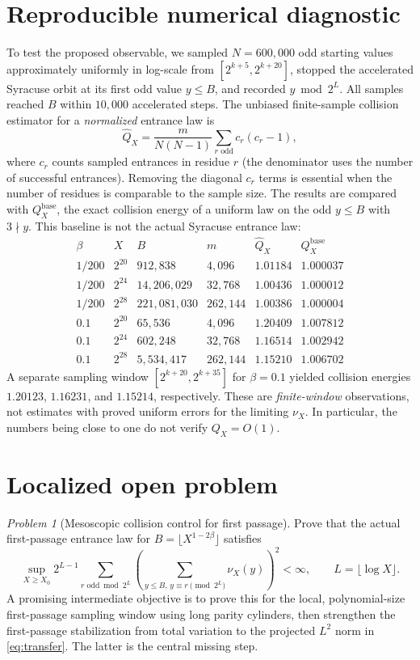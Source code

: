 \documentclass[11pt]{amsart}
\theoremstyle{remark}
\newtheorem{problem}{Problem}
\newcommand{\1}{\mathbf1}
\begin{document}
\section{Reproducible numerical diagnostic}
To test the proposed observable, we sampled $N=600{,}000$ odd starting values approximately uniformly in log-scale from $[2^{k+5},2^{k+20}]$, stopped the accelerated Syracuse orbit at its first odd value $y\le B$, and recorded $y\bmod2^L$. All samples reached $B$ within $10{,}000$ accelerated steps. The unbiased finite-sample collision estimator for a \emph{normalized} entrance law is
\[
 \widehat Q_X=\frac{m}{N(N-1)}\sum_{r\text{ odd}}c_r(c_r-1),
\]
where $c_r$ counts sampled entrances in residue $r$ (the denominator uses the number of successful entrances). Removing the diagonal $c_r$ terms is essential when the number of residues is comparable to the sample size. The results are compared with $Q_X^{\mathrm{base}}$, the exact collision energy of a uniform law on the odd $y\le B$ with $3\nmid y$.  This baseline is not the actual Syracuse entrance law:
\[
\begin{array}{c|r|r|r|r|r}
 \beta & X & B & m & \widehat Q_X & Q_X^{\mathrm{base}} \\\hline
 1/200&2^{20}&912{,}838&4{,}096&1.01184&1.000037\\
 1/200&2^{24}&14{,}206{,}029&32{,}768&1.00436&1.000012\\
 1/200&2^{28}&221{,}081{,}030&262{,}144&1.00386&1.000004\\
 0.1&2^{20}&65{,}536&4{,}096&1.20409&1.007812\\
 0.1&2^{24}&602{,}248&32{,}768&1.16514&1.002942\\
 0.1&2^{28}&5{,}534{,}417&262{,}144&1.15210&1.006702
\end{array}
\]
A separate sampling window $[2^{k+20},2^{k+35}]$ for $\beta=0.1$ yielded collision energies $1.20123$, $1.16231$, and $1.15214$, respectively. These are \emph{finite-window} observations, not estimates with proved uniform errors for the limiting $\nu_X$. In particular, the numbers being close to one do not verify $Q_X=O(1)$.

\section{Localized open problem}
\begin{problem}[Mesoscopic collision control for first passage]
Prove that the actual first-passage entrance law for $B=\lfloor X^{1-2\beta}\rfloor$ satisfies
\[
 \sup_{X\ge X_0}2^{L-1}\sum_{r\text{ odd}\bmod2^L}
 \left(\sum_{y\le B,\,y\equiv r\pmod{2^L}}\nu_X(y)\right)^2<\infty,
 \qquad L=\lfloor\log X\rfloor.
\]
A promising intermediate objective is to prove this for the local, polynomial-size first-passage sampling window using long parity cylinders, then strengthen the first-passage stabilization from total variation to the projected $L^2$ norm in \eqref{eq:transfer}. The latter is the central missing step.
\end{problem}
\end{document}
